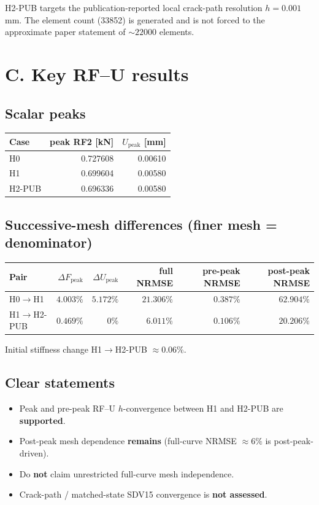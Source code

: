 \documentclass[11pt,a4paper]{article}
\begin{document}
H2-PUB targets the publication-reported local crack-path resolution $h=0.001$\,mm. The element count (33852) is generated and is not forced to the approximate paper statement of $\sim 22000$ elements.

\section*{C. Key RF--U results}

\subsection*{Scalar peaks}
\begin{center}
\begin{tabular}{@{}lrr@{}}
\toprule
Case & peak RF2 [kN] & $U_\mathrm{peak}$ [mm] \\
\midrule
H0 & 0.727608 & 0.00610 \\
H1 & 0.699604 & 0.00580 \\
H2-PUB & 0.696336 & 0.00580 \\
\bottomrule
\end{tabular}
\end{center}

\subsection*{Successive-mesh differences (finer mesh = denominator)}
\begin{center}
\begin{tabular}{@{}lrrrrr@{}}
\toprule
Pair & $\Delta F_\mathrm{peak}$ & $\Delta U_\mathrm{peak}$ & full NRMSE & pre-peak NRMSE & post-peak NRMSE \\
\midrule
H0$\to$H1 & $4.003\%$ & $5.172\%$ & $21.306\%$ & $0.387\%$ & $62.904\%$ \\
H1$\to$H2-PUB & $0.469\%$ & $0\%$ & $6.011\%$ & $0.106\%$ & $20.206\%$ \\
\bottomrule
\end{tabular}
\end{center}

Initial stiffness change H1$\to$H2-PUB $\approx 0.06\%$.

\subsection*{Clear statements}
\begin{itemize}
  \item Peak and pre-peak RF--U $h$-convergence between H1 and H2-PUB are \textbf{supported}.
  \item Post-peak mesh dependence \textbf{remains} (full-curve NRMSE $\approx 6\%$ is post-peak-driven).
  \item Do \textbf{not} claim unrestricted full-curve mesh independence.
  \item Crack-path / matched-state SDV15 convergence is \textbf{not assessed}.
\end{itemize}
\end{document}
